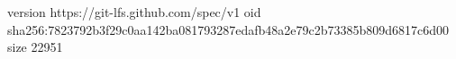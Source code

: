 version https://git-lfs.github.com/spec/v1
oid sha256:7823792b3f29c0aa142ba081793287edafb48a2e79c2b73385b809d6817c6d00
size 22951
